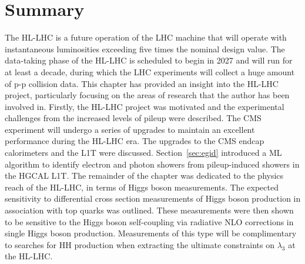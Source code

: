 \section{Summary}
The HL-LHC is a future operation of the LHC machine that will operate with instantaneous luminosities exceeding five times the nominal design value. The data-taking phase of the HL-LHC is scheduled to begin in 2027 and will run for at least a decade, during which the LHC experiments will collect a huge amount of p-p collision data. This chapter has provided an insight into the HL-LHC project, particularly focusing on the areas of research that the author has been involved in. Firstly, the HL-LHC project was motivated and the experimental challenges from the increased levels of pileup were described. The CMS experiment will undergo a series of upgrades to maintain an excellent performance during the HL-LHC era. The upgrades to the CMS endcap calorimeters and the L1T were discussed. Section~\ref{sec:egid} introduced a ML algorithm to identify electron and photon showers from pileup-induced showers in the HGCAL L1T. The remainder of the chapter was dedicated to the physics reach of the HL-LHC, in terms of Higgs boson measurements. The expected sensitivity to differential cross section measurements of Higgs boson production in association with top quarks was outlined. These measurements were then shown to be sensitive to the Higgs boson self-coupling via radiative NLO corrections in single Higgs boson production. Measurements of this type will be complimentary to searches for HH production when extracting the ultimate constraints on $\lambda_3$ at the HL-LHC.